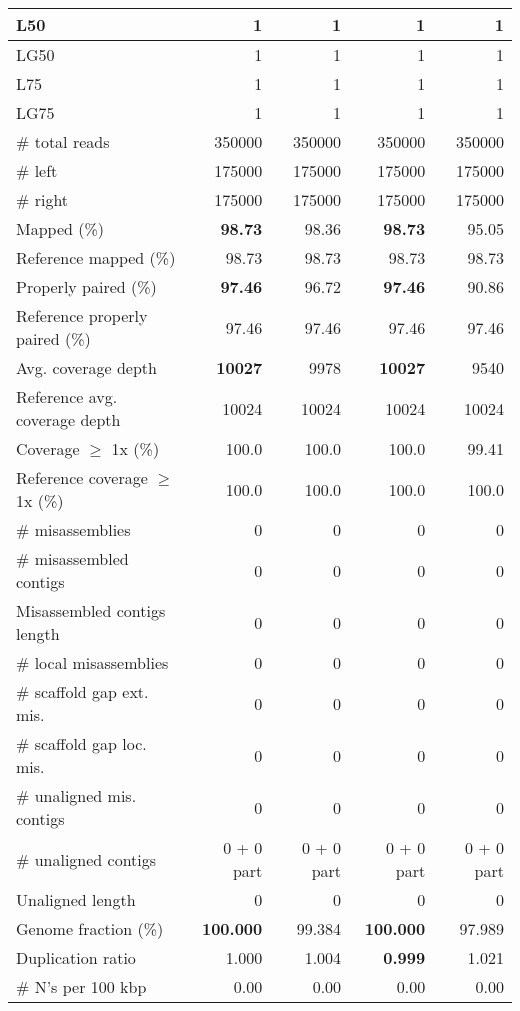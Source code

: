 \documentclass[12pt,a4paper]{article}
\begin{document}
\begin{table}[ht]
\begin{center}
\begin{tabular}{|l*{4}{|r}|}
L50 & 1 & 1 & 1 & 1 \\ \hline
LG50 & 1 & 1 & 1 & 1 \\ \hline
L75 & 1 & 1 & 1 & 1 \\ \hline
LG75 & 1 & 1 & 1 & 1 \\ \hline
\# total reads & 350000 & 350000 & 350000 & 350000 \\ \hline
\# left & 175000 & 175000 & 175000 & 175000 \\ \hline
\# right & 175000 & 175000 & 175000 & 175000 \\ \hline
Mapped (\%) & {\bf 98.73} & 98.36 & {\bf 98.73} & 95.05 \\ \hline
Reference mapped (\%) & 98.73 & 98.73 & 98.73 & 98.73 \\ \hline
Properly paired (\%) & {\bf 97.46} & 96.72 & {\bf 97.46} & 90.86 \\ \hline
Reference properly paired (\%) & 97.46 & 97.46 & 97.46 & 97.46 \\ \hline
Avg. coverage depth & {\bf 10027} & 9978 & {\bf 10027} & 9540 \\ \hline
Reference avg. coverage depth & 10024 & 10024 & 10024 & 10024 \\ \hline
Coverage $\geq$ 1x (\%) & 100.0 & 100.0 & 100.0 & 99.41 \\ \hline
Reference coverage $\geq$ 1x (\%) & 100.0 & 100.0 & 100.0 & 100.0 \\ \hline
\# misassemblies & 0 & 0 & 0 & 0 \\ \hline
\# misassembled contigs & 0 & 0 & 0 & 0 \\ \hline
Misassembled contigs length & 0 & 0 & 0 & 0 \\ \hline
\# local misassemblies & 0 & 0 & 0 & 0 \\ \hline
\# scaffold gap ext. mis. & 0 & 0 & 0 & 0 \\ \hline
\# scaffold gap loc. mis. & 0 & 0 & 0 & 0 \\ \hline
\# unaligned mis. contigs & 0 & 0 & 0 & 0 \\ \hline
\# unaligned contigs & 0 + 0 part & 0 + 0 part & 0 + 0 part & 0 + 0 part \\ \hline
Unaligned length & 0 & 0 & 0 & 0 \\ \hline
Genome fraction (\%) & {\bf 100.000} & 99.384 & {\bf 100.000} & 97.989 \\ \hline
Duplication ratio & 1.000 & 1.004 & {\bf 0.999} & 1.021 \\ \hline
\# N's per 100 kbp & 0.00 & 0.00 & 0.00 & 0.00 \\ \hline

\end{tabular}
\end{center}
\end{table}
\end{document}
